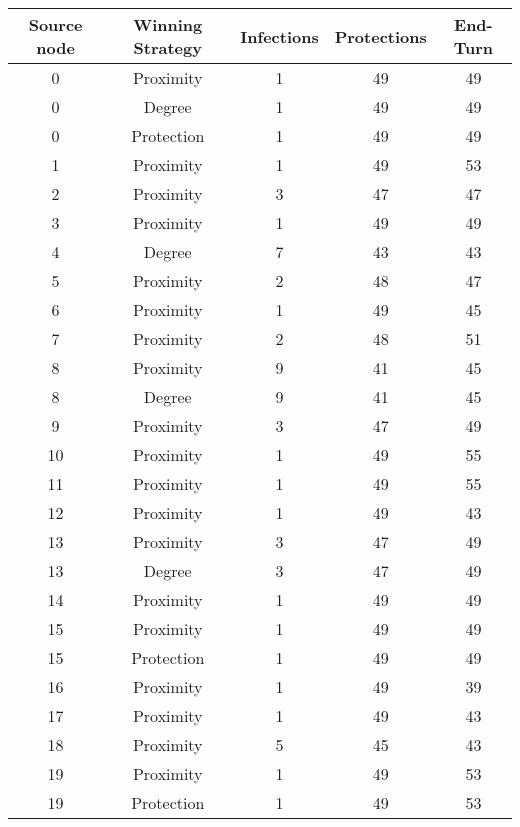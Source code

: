 \documentclass[results.tex]{subfiles}
\begin{document}
\begin{center}
  \begin{tabular}{| c || c | c | c | c |}
    \hline
    {\bfseries Source node} & {\bfseries Winning Strategy} & {\bfseries Infections} & {\bfseries Protections} & {\bfseries End-Turn} \\  %
    \hline\hline
    0 & Proximity & 1 & 49 & 49 \\ 
    \hline
    0 & Degree & 1 & 49 & 49 \\ 
    \hline
    0 & Protection & 1 & 49 & 49 \\ 
    \hline
    1 & Proximity & 1 & 49 & 53 \\ 
    \hline
    2 & Proximity & 3 & 47 & 47 \\ 
    \hline
    3 & Proximity & 1 & 49 & 49 \\ 
    \hline
    4 & Degree & 7 & 43 & 43 \\ 
    \hline
    5 & Proximity & 2 & 48 & 47 \\ 
    \hline
    6 & Proximity & 1 & 49 & 45 \\ 
    \hline
    7 & Proximity & 2 & 48 & 51 \\ 
    \hline
    8 & Proximity & 9 & 41 & 45 \\ 
    \hline
    8 & Degree & 9 & 41 & 45 \\ 
    \hline
    9 & Proximity & 3 & 47 & 49 \\ 
    \hline
    10 & Proximity & 1 & 49 & 55 \\ 
    \hline
    11 & Proximity & 1 & 49 & 55 \\ 
    \hline
    12 & Proximity & 1 & 49 & 43 \\ 
    \hline
    13 & Proximity & 3 & 47 & 49 \\ 
    \hline
    13 & Degree & 3 & 47 & 49 \\ 
    \hline
    14 & Proximity & 1 & 49 & 49 \\ 
    \hline
    15 & Proximity & 1 & 49 & 49 \\ 
    \hline
    15 & Protection & 1 & 49 & 49 \\ 
    \hline
    16 & Proximity & 1 & 49 & 39 \\ 
    \hline
    17 & Proximity & 1 & 49 & 43 \\ 
    \hline
    18 & Proximity & 5 & 45 & 43 \\ 
    \hline
    19 & Proximity & 1 & 49 & 53 \\ 
    \hline
    19 & Protection & 1 & 49 & 53 \\ 

\end{tabular}
\end{center}
\end{document}
